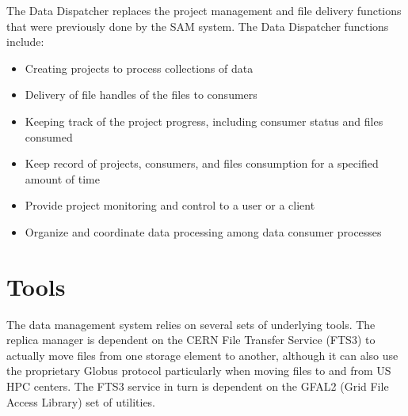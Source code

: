 \documentclass[../main-v1.tex]{subfiles}
\begin{document}
The Data Dispatcher replaces the project management and file delivery functions that were previously done by the SAM system.  The Data Dispatcher functions include:
\begin{itemize}
    \item Creating projects to process collections of data
    
    \item Delivery of file handles of the files to consumers
    
    \item Keeping track of the project progress, including consumer status and files consumed
    
    \item Keep record of projects, consumers, and files consumption for a specified amount of time
    
    \item Provide project monitoring and control to a user or a client
    
    \item Organize and coordinate data processing among data consumer processes

\end{itemize}



\section{Tools }

The data management system relies on several sets of underlying tools.  The  replica manager is dependent on the CERN File Transfer Service (FTS3) \cite{Kiryanov:2015fts} to actually move files from one storage element to another, although it can also use the proprietary
Globus protocol particularly when moving files to and from US HPC centers.  The FTS3 service in turn is dependent on the
GFAL2 (Grid File Access Library) set of utilities.
\end{document}

